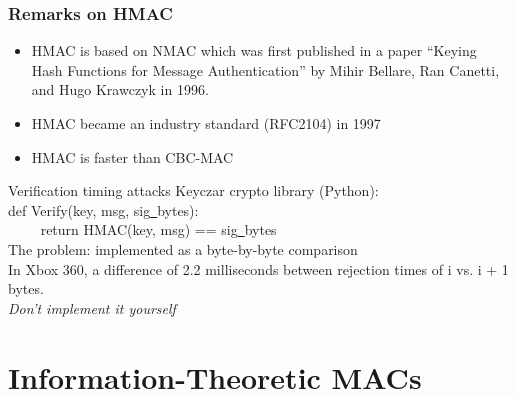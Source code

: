 \begin{frame}\frametitle{Remarks on HMAC}
\begin{itemize}
\item HMAC is based on NMAC which was first published in a paper ``Keying Hash Functions for Message Authentication'' by Mihir Bellare, Ran Canetti, and Hugo Krawczyk in 1996.
\item HMAC became an industry standard (RFC2104) in 1997
\item HMAC is faster than CBC-MAC
\end{itemize}
\begin{exampleblock}{Verification timing attacks}
Keyczar crypto library (Python): \\
def Verify(key, msg, sig\underline{\ }bytes): \\
$\qquad$ return HMAC(key, msg) == sig\underline{\ }bytes \\
The problem:  implemented as a byte-by-byte comparison \\
In Xbox 360, a difference of 2.2 milliseconds between rejection times of i vs. i + 1 bytes. \\
\alert{\emph{Don't implement it yourself}}
\end{exampleblock}
\end{frame}
\section{Information-Theoretic MACs}

